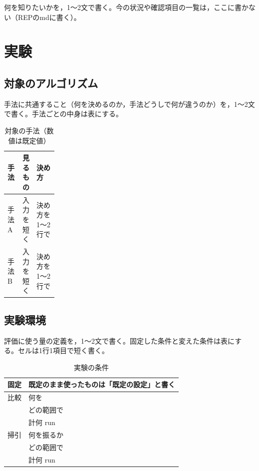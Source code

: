 \documentclass[twocolumn, 10pt]{ujarticle}
\begin{document}
何を知りたいかを，1〜2文で書く。今の状況や確認項目の一覧は，ここに書かない（REPのmdに書く）。

\section{実験}\label{sec:e-exp}

\subsection{対象のアルゴリズム}\label{sec:e-algo}

手法に共通すること（何を決めるのか，手法どうしで何が違うのか）を，1〜2文で書く。手法ごとの中身は表にする。

\begin{table}[H]
\centering
\caption{対象の手法（数値は既定値）}
\label{tab:e-algo}
\footnotesize
\begin{tabularx}{\linewidth}{@{}l>{\raggedright\arraybackslash}p{0.2\linewidth}>{\raggedright\arraybackslash}X@{}}
\toprule
手法 & 見るもの & 決め方 \\
\midrule
手法A & 入力を短く & 決め方を1〜2行で \\
\addlinespace
手法B & 入力を短く & 決め方を1〜2行で \\
\bottomrule
\end{tabularx}
\end{table}

\subsection{実験環境}\label{sec:e-env}

評価に使う量の定義を，1〜2文で書く。固定した条件と変えた条件は表にする。セルは1行1項目で短く書く。

\begin{table}[H]
\centering
\caption{実験の条件}
\label{tab:e-cond}
\footnotesize
\begin{tabularx}{\linewidth}{@{}l>{\raggedright\arraybackslash}X@{}}
\toprule
固定 & 既定のまま使ったものは「既定の設定」と書く \\
\midrule
比較 & 何を \\
 & どの範囲で \\
 & 計何 run \\
\midrule
掃引 & 何を振るか \\
 & どの範囲で \\
 & 計何 run \\
\bottomrule
\end{tabularx}
\end{table}
\end{document}
